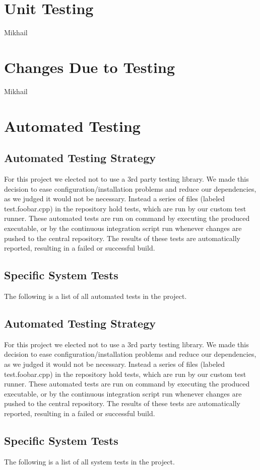 \documentclass[12pt, titlepage]{article}
\newcommand{\newsection}[1]{
  \newpage
  \section{#1}
}
\begin{document}
\newsection{Unit Testing} \label{Section_UT}
	Mikhail

\newsection{Changes Due to Testing} \label{Section_Changes}
	Mikhail

\newsection{Automated Testing} \label{Section_Automated}

\subsection{Automated Testing Strategy}
For this project we elected not to use a 3rd party testing library. We made this decision to ease configuration/installation problems and reduce our dependencies, as we judged it would not be necessary. Instead a series of files (labeled test.foobar.cpp) in the repository hold tests, which are run by our custom test runner. These automated tests are run on command by executing the produced executable, or by the continuous integration script run whenever changes are pushed to the central repository. The results of these tests are automatically reported, resulting in a failed or successful build.

\subsection{Specific System Tests}
The following is a list of all automated tests in the project.

	\subsection{Automated Testing Strategy}
	For this project we elected not to use a 3rd party testing library. We made this decision to ease configuration/installation problems and reduce our dependencies, as we judged it would not be necessary. Instead a series of files (labeled test.foobar.cpp) in the repository hold tests, which are run by our custom test runner. These automated tests are run on command by executing the produced executable, or by the continuous integration script run whenever changes are pushed to the central repository. The results of these tests are automatically reported, resulting in a failed or successful build.

	\subsection{Specific System Tests}
	The following is a list of all system tests in the project.
\end{document}
